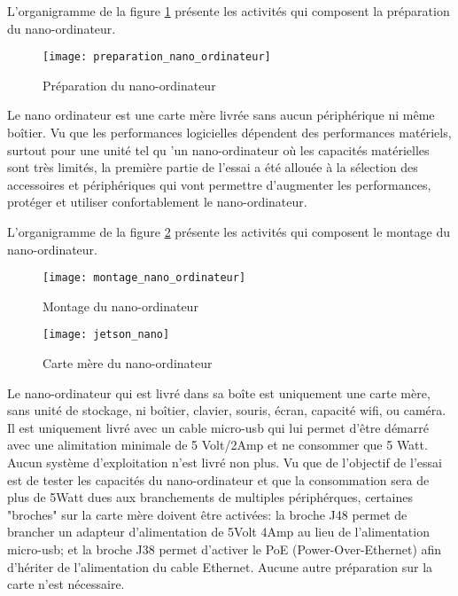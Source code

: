 \label{preparation_nano_ordinateur}
\par L'organigramme de la figure \ref{fig:preparation_nano_ordinateur} présente les activités qui composent la préparation du nano-ordinateur. 
\begin{figure}
    \centering
    \texttt{[image: preparation\_nano\_ordinateur]}
    \caption{Préparation du nano-ordinateur}
    \label{fig:preparation_nano_ordinateur}
\end{figure}
\par Le nano ordinateur est une carte mère livrée sans aucun périphérique ni même boîtier. Vu que les performances logicielles dépendent des performances matériels, surtout pour une unité tel qu 'un nano-ordinateur où les capacités matérielles sont très limités, la première partie de l'essai a été allouée à la sélection des accessoires et périphériques qui vont permettre d'augmenter les performances, protéger et utiliser confortablement le nano-ordinateur. 
\label{montage_nano_ordinateur}
\par L'organigramme de la figure \ref{fig:montage_nano_ordinateur} présente les activités qui composent le montage du nano-ordinateur. 
\begin{figure}
    \centering
    \texttt{[image: montage\_nano\_ordinateur]}
    \caption{Montage du nano-ordinateur}
    \label{fig:montage_nano_ordinateur}
\end{figure}
\begin{figure}
    \centering
    \texttt{[image: jetson\_nano]}
    \caption{Carte mère du nano-ordinateur}
    \label{fig:jetson_nano}
\end{figure}
\par Le nano-ordinateur qui est livré dans sa boîte est uniquement une carte mère, sans unité de stockage, ni boîtier, clavier, souris, écran, capacité wifi, ou caméra. Il est uniquement livré avec un cable micro-usb qui lui permet d'être démarré avec une alimitation minimale de 5 Volt/2Amp et ne consommer que 5 Watt. Aucun système d'exploitation n'est livré non plus. Vu que de l'objectif de l'essai est de tester les capacités du nano-ordinateur et que la consommation sera de plus de 5Watt dues aux branchements de multiples périphérques, certaines "broches" sur la carte mère doivent être activées:  la broche J48 permet de brancher un adapteur d'alimentation de 5Volt 4Amp au lieu de l'alimentation micro-usb; et la broche J38 permet d'activer le PoE (Power-Over-Ethernet) afin d'hériter de l'alimentation du cable Ethernet. Aucune autre préparation sur la carte n'est nécessaire.
